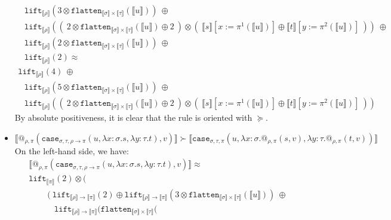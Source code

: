\documentclass[a4paper,UKenglish,cleveref,autoref,numberwithinsect]{lipics-v2019}
\theoremstyle{definition}
\newcommand{\arrtype}{\rightarrow}
\newcommand{\abs}[2]{\lambda #1.#2}
\newcommand{\flatten}{\mathtt{flatten}}
\newcommand{\lift}{\mathtt{lift}}
\newcommand{\typeinterpret}[1]{\llbracket #1 \rrbracket}
\newcommand{\interpret}[1]{\llbracket #1 \rrbracket}
\begin{document}
\begin{itemize}
\[\begin{array}{l}
  \phantom{A}
  \lift_{\typeinterpret{\rho}}(3 \otimes \flatten_{\typeinterpret{
    \sigma} \times \typeinterpret{\tau}}(\interpret{u}))\ \oplus \\
  \phantom{A}
  \lift_{\typeinterpret{\rho}}((\ 2 \otimes \flatten_{\typeinterpret{
    \sigma} \times \typeinterpret{\tau}}(\interpret{u}) \oplus 2\ )
    \otimes (\ \interpret{s}[x:=\pi^1(\interpret{u})] \oplus
    \interpret{t}[y:=\pi^2(\interpret{u})]\ ))\ \oplus \\
  \phantom{A}
  \lift_{\typeinterpret{\rho}}(2 \otimes \flatten_{\typeinterpret{\sigma}
    \times \typeinterpret{\tau}}(\interpret{u}))\ \oplus \\
  \phantom{A}
    \lift_{\typeinterpret{\rho}}(2) \approx \\
  \lift_{\typeinterpret{\rho}}(4)\ \oplus \\
  \phantom{A}
  \lift_{\typeinterpret{\rho}}(5 \otimes \flatten_{\typeinterpret{
    \sigma} \times \typeinterpret{\tau}}(\interpret{u}))\ \oplus \\
  \phantom{A}
  \lift_{\typeinterpret{\rho}}((\ 2 \otimes \flatten_{\typeinterpret{
    \sigma} \times \typeinterpret{\tau}}(\interpret{u}) \oplus 2\ )
    \otimes (\ \interpret{s}[x:=\pi^1(\interpret{u})] \oplus
    \interpret{t}[y:=\pi^2(\interpret{u})]\ ) )
  \end{array}
  \]
  By absolute positiveness, it is clear that the rule is oriented
  with $\succeq$.
\item $\interpret{@_{\rho,\pi}(\mathtt{case}_{\sigma,\tau,\rho
  \arrtype \pi}(u,\abs{x:\sigma}{s},\abs{y:\tau}{t}),v)} \succ
  \interpret{\mathtt{case}_{\sigma,\tau,\pi}(u,\abs{x:\sigma}{
  @_{\rho,\pi}(s,v)},\abs{y:\tau}{@_{\rho,\pi}(t,v)})}$ \\
  On the left-hand side, we have:
  \[
  \begin{array}{l}
  \interpret{@_{\rho,\pi}(\mathtt{case}_{\sigma,\tau,\rho \arrtype
  \pi}(u,\abs{x:\sigma}{s},\abs{y:\tau}{t}),v)} \approx \\
  \lift_{\typeinterpret{\pi}}(2) \otimes (\\
    \phantom{ABC}
    (\ \lift_{\typeinterpret{\rho} \arrtype \typeinterpret{\pi}}(2)
       \oplus \lift_{\typeinterpret{\rho} \arrtype
       \typeinterpret{\pi}}(3 \otimes \flatten_{\typeinterpret{\sigma}
       \times \typeinterpret{\tau}}(\interpret{u}))\ \oplus \\
    \phantom{ABCD}
      \lift_{\typeinterpret{\rho} \arrtype \typeinterpret{\pi}}(
      \flatten_{\typeinterpret{\sigma} \times \typeinterpret{\tau}}(

\end{array}\]
\end{itemize}
\end{document}
